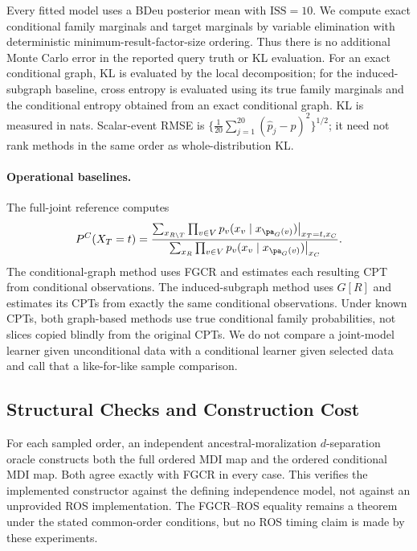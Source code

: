 Every fitted model uses a BDeu posterior mean with $\mathrm{ISS}=10$.
We compute exact conditional family marginals and target marginals by
variable elimination with deterministic minimum-result-factor-size
ordering. Thus there is no additional Monte Carlo error in the reported
query truth or KL evaluation. For an exact conditional graph,
KL is evaluated by the local decomposition; for the induced-subgraph
baseline, cross entropy is evaluated using its true family marginals
and the conditional entropy obtained from an exact conditional graph.
KL is measured in nats. Scalar-event RMSE is
$\{\frac1{20}\sum_{j=1}^{20}(\widehat p_j-p)^2\}^{1/2}$;
it need not rank methods in the same order as whole-distribution KL.

\paragraph{Operational baselines.}
The full-joint reference computes
\[
P^C(X_T=t)=
\frac{\sum_{x_{R\setminus T}}\prod_{v\in V}
 p_v(x_v\mid x_{\pa_G(v)})\big|_{x_T=t,x_C}}
{\sum_{x_R}\prod_{v\in V}
 p_v(x_v\mid x_{\pa_G(v)})\big|_{x_C}}.
\]
The conditional-graph method uses FGCR and estimates each resulting CPT
from conditional observations. The induced-subgraph method uses $G[R]$
and estimates its CPTs from exactly the same conditional observations.
Under known CPTs, both graph-based methods use true conditional family
probabilities, not slices copied blindly from the original CPTs.
We do not compare a joint-model learner given unconditional data with a
conditional learner given selected data and call that a like-for-like
sample comparison.

\subsection{Structural Checks and Construction Cost}
\label{subsec:structural-consistency-experiment}
For each sampled order, an independent ancestral-moralization
$d$-separation oracle constructs both the full ordered MDI map and the
ordered conditional MDI map. Both agree exactly with FGCR in every case.
This verifies the implemented constructor against the defining
independence model, not against an unprovided ROS implementation.
The FGCR--ROS equality remains a theorem under the stated common-order
conditions, but no ROS timing claim is made by these experiments.




